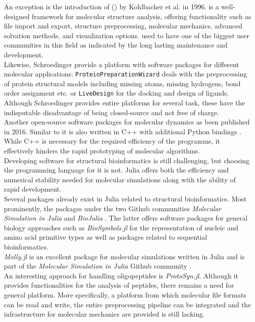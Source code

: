 An exception is the introduction of \ballFull (\ball) by Kohlbacher et al. in 1996.  \ball is a well-designed framework for molecular structure analysis, offering functionality such as file import and export, structure preprocessing, molecular mechanics, advanced solvation methods, and visualization options. \ball used to have one of the biggest user communities in this field as indicated by the long lasting maintenance and development. \\
Likewise, Schroedinger provide a platform with software packages for different molecular applications: \texttt{ProteinPreparationWizard} deals with the preprocessing of protein structural models including missing atoms, missing hydrogens, bond order assignment etc. or \texttt{LiveDesign} for the docking and design of ligands. Although Schroedinger provides entire platforms for several task, these have the indisputable disadvantage of being closed-source and not free of charge. \\
Another open-source software packages for molecular dynamics as been published in 2016. Similar to \ball it is also written in C++ with additional Python bindings \cite{Doerr2016HTMD}. While C++ is necessary for the required efficiency of the programms, it effectively hinders the rapid prototyping of molecular algorithms.  \\
Developing software for structural bioinformatics is still challenging, but choosing the programming language for it is not. Julia offers both the efficiency and numerical stability needed for molecular simulations along with the ability of rapid development. \\

Several packages already exist in Julia related to structural bioinformatics. Most prominently, the packages under the two Github communities \textit{Molecular Simulation in Julia} and \textit{BioJulia} \cite{JuliaMolSim, BioJulia}. The latter offers software packages for general biology approaches such as \textit{BioSymbols.jl} for the representation of nucleic and amino acid primitive types as well as packages related to sequential bioinformatics. \\

\textit{Molly.jl} is an excellent package for molecular simulations written in Julia and is part of the \textit{Molecular Simulation in Julia} Github community \cite{Greener2024}. \\
An interesting approach for handling oligopeptides is \textit{ProtoSyn.jl}. Although it provides functionalities for the analysis of peptides, there remains a need for general platform. More specifically, a platform from which molecular file formats can be read and write, the entire preprocessing pipeline can be integrated and the infrastructure for molecular mechanics are provided is still lacking. \\

